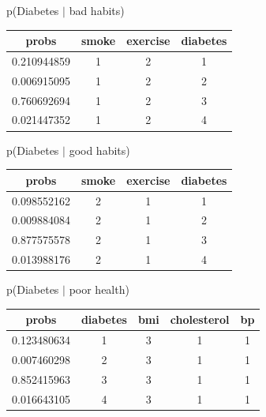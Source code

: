 \documentclass[11pt]{article}
\begin{document}


p(Diabetes $|$ bad habits)

\begin{table}[!hbt]
\begin{center}
\begin{tabular}{ |c|c|c|c| }
  \hline
  probs & smoke & exercise & diabetes \\
  \hline
  0.210944859 & 1 & 2 & 1 \\
  \hline
  0.006915095 & 1 & 2 & 2 \\
  \hline
  0.760692694  & 1  &     2 &    3 \\
  \hline
  0.021447352  &    1    & 2   & 4 \\
  \hline
\end{tabular}
\end{center}
\end{table}
\vspace{-20pt}
 
p(Diabetes $|$ good habits)

\begin{table}[!hbt]
\begin{center}
\begin{tabular}{ |c|c|c|c| }
  \hline
  probs & smoke & exercise & diabetes \\
  \hline
  0.098552162 & 2 & 1 & 1 \\
  \hline
  0.009884084 & 2 & 1 & 2 \\
  \hline
  0.877575578  & 2  &     1 &    3 \\
  \hline
  0.013988176  &    2    & 1   & 4 \\
  \hline
\end{tabular}
\end{center}
\end{table}
\vspace{-20pt}


p(Diabetes $|$ poor health)

\begin{table}[!hbt]
\begin{center}
\begin{tabular}{ |c|c|c|c|c| }
  \hline
  probs & diabetes & bmi & cholesterol & bp \\
  \hline
  0.123480634 & 1 & 3 & 1 & 1\\
  \hline 
  0.007460298 & 2 & 3 & 1 & 1 \\
  \hline
  0.852415963  & 3  &  3 &  1 & 1 \\
  \hline
  0.016643105  &   4    & 3   & 1 & 1 \\
  \hline
\end{tabular}
\end{center}
\end{table}
\vspace{-20pt}
\end{document}
